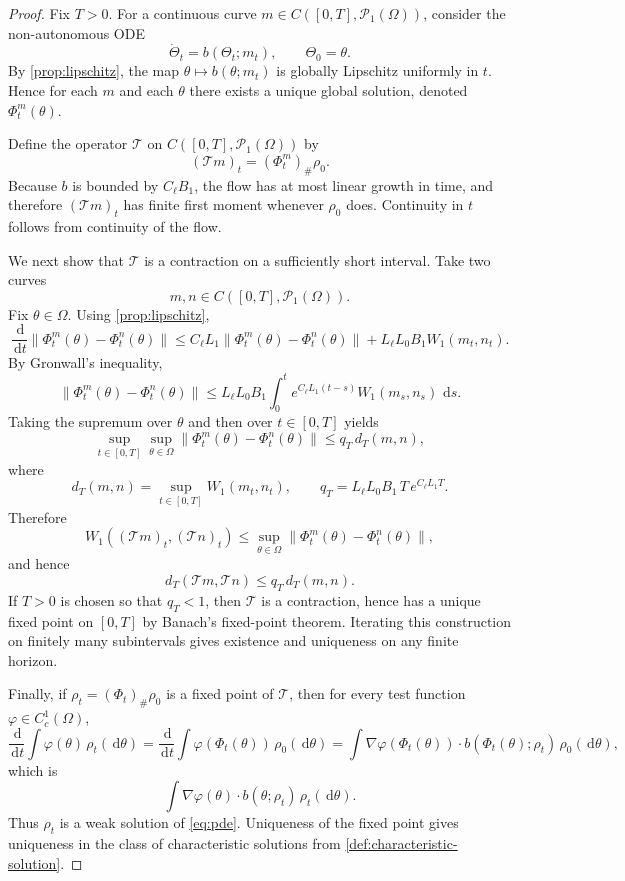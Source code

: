 \documentclass[11pt]{article}
\theoremstyle{definition}
\newcommand{\PP}{\mathcal{P}}
\newcommand{\W}{W_1}
\newcommand{\dd}{\,\mathrm{d}}
\begin{document}
\begin{proof}
Fix $T>0$.
For a continuous curve $m \in C([0,T],\PP_1(\Omega))$, consider the non-autonomous ODE
\[
  \dot{\Theta}_t = b(\Theta_t;m_t),
  \qquad
  \Theta_0=\theta.
\]
By \cref{prop:lipschitz}, the map $\theta \mapsto b(\theta;m_t)$ is globally Lipschitz uniformly in $t$.
Hence for each $m$ and each $\theta$ there exists a unique global solution, denoted $\Phi_t^m(\theta)$.

Define the operator $\mathcal{T}$ on $C([0,T],\PP_1(\Omega))$ by
\[
  (\mathcal{T}m)_t = (\Phi_t^m)_\# \rho_0.
\]
Because $b$ is bounded by $C_\ell B_1$, the flow has at most linear growth in time, and therefore $(\mathcal{T}m)_t$ has finite first moment whenever $\rho_0$ does.
Continuity in $t$ follows from continuity of the flow.

We next show that $\mathcal{T}$ is a contraction on a sufficiently short interval.
Take two curves
\[
  m,n \in C([0,T],\PP_1(\Omega)).
\]
Fix $\theta \in \Omega$.
Using \cref{prop:lipschitz},
\[
  \frac{\dd}{\dd t}
  \|\Phi_t^m(\theta)-\Phi_t^n(\theta)\|
  \le
  C_\ell L_1 \|\Phi_t^m(\theta)-\Phi_t^n(\theta)\|
  +
  L_\ell L_0 B_1 \W(m_t,n_t).
\]
By Gronwall's inequality,
\[
  \|\Phi_t^m(\theta)-\Phi_t^n(\theta)\|
  \le
  L_\ell L_0 B_1
  \int_0^t e^{C_\ell L_1 (t-s)} \W(m_s,n_s)\,\dd s.
\]
Taking the supremum over $\theta$ and then over $t\in[0,T]$ yields
\[
  \sup_{t\in[0,T]} \sup_{\theta \in \Omega}
  \|\Phi_t^m(\theta)-\Phi_t^n(\theta)\|
  \le
  q_T \, d_T(m,n),
\]
where
\[
  d_T(m,n)=\sup_{t\in[0,T]} \W(m_t,n_t),
  \qquad
  q_T = L_\ell L_0 B_1\, T\, e^{C_\ell L_1 T}.
\]
Therefore
\[
  \W((\mathcal{T}m)_t,(\mathcal{T}n)_t)
  \le
  \sup_{\theta \in \Omega}
  \|\Phi_t^m(\theta)-\Phi_t^n(\theta)\|,
\]
and hence
\[
  d_T(\mathcal{T}m,\mathcal{T}n)
  \le
  q_T \, d_T(m,n).
\]
If $T>0$ is chosen so that $q_T<1$, then $\mathcal{T}$ is a contraction, hence has a unique fixed point on $[0,T]$ by Banach's fixed-point theorem.
Iterating this construction on finitely many subintervals gives existence and uniqueness on any finite horizon.

Finally, if $\rho_t=(\Phi_t)_\# \rho_0$ is a fixed point of $\mathcal{T}$, then for every test function $\varphi \in C_c^1(\Omega)$,
\[
  \frac{\dd}{\dd t} \int \varphi(\theta)\,\rho_t(\dd \theta)
  =
  \frac{\dd}{\dd t} \int \varphi(\Phi_t(\theta))\,\rho_0(\dd \theta)
  =
  \int \nabla \varphi(\Phi_t(\theta)) \cdot b(\Phi_t(\theta);\rho_t)\,\rho_0(\dd \theta),
\]
which is
\[
  \int \nabla \varphi(\theta)\cdot b(\theta;\rho_t)\,\rho_t(\dd \theta).
\]
Thus $\rho_t$ is a weak solution of \eqref{eq:pde}.
Uniqueness of the fixed point gives uniqueness in the class of characteristic solutions from
\cref{def:characteristic-solution}.
\end{proof}
\end{document}
